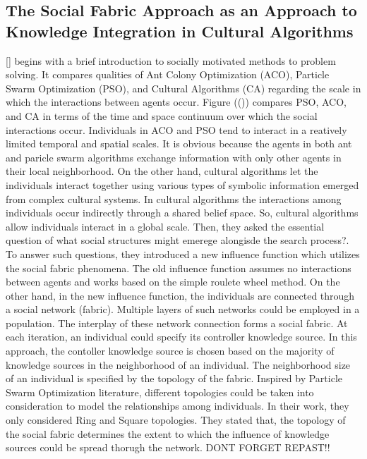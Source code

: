 \subsection{The Social Fabric Approach as an Approach to Knowledge Integration in Cultural Algorithms}	
[] begins with a brief introduction to socially motivated methods to problem solving. It compares qualities of Ant Colony Optimization (ACO), Particle Swarm Optimization (PSO), and Cultural Algorithms (CA) regarding the scale in which the interactions between agents occur. Figure (()) compares PSO, ACO, and CA in terms of the time and space continuum over which the social interactions occur. Individuals in ACO and PSO tend to interact in a reatively limited temporal and spatial scales. It is obvious because the agents in both ant and paricle swarm algorithms exchange information with only other agents in their local neighborhood. On the other hand, cultural algorithms let the individuals interact together using various types of symbolic information emerged from complex cultural systems. In cultural algorithms the interactions among individuals occur indirectly through a shared belief space. So, cultural algorithms allow individuals interact in a global scale.\newline
Then, they asked the essential question of what social structures might emerege alongisde the search process?. To answer such questions, they introduced a new influence function which utilizes the social fabric phenomena. The old influence function assumes no interactions between agents and works based on the simple roulete wheel method. On the other hand, in the new influence function, the individuals are connected through a social network (fabric). Multiple layers of such networks could be employed in a population. The interplay of these network connection forms a social fabric. At each iteration, an individual could specify its controller knowledge source. In this approach, the contoller knowledge source is chosen based on the majority of knowledge sources in the neighborhood of an individual. The neighborhood size of an individual is specified by the topology of the fabric. Inspired by Particle Swarm Optimization literature, different topologies could be taken into consideration to model the relationships among individuals. In their work, they only considered Ring and Square topologies. They stated that, the topology of the social fabric determines the extent to which the influence of knowledge sources could be spread thorugh the network.\newline
DONT FORGET REPAST!!

